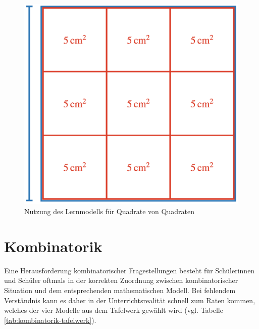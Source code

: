 \documentclass[
]{scrbook}
\theoremstyle{definition}
\theoremstyle{definition}
\theoremstyle{definition}
\theoremstyle{definition}
\theoremstyle{remark}
\begin{document}
\begin{enumerate}
  \begin{figure}

   {\centering \includegraphics[width=0.5\linewidth]{pictures/10-QuadratQuadrat} 

   }

   \caption{Nutzung des Lernmodells für Quadrate von Quadraten}\label{fig:QuadratQuadrat}
   \end{figure}
\end{enumerate}

\hypertarget{kombinatorik}{%
\section{Kombinatorik}\label{kombinatorik}}

Eine Herausforderung kombinatorischer Fragestellungen besteht für Schülerinnen und Schüler oftmals in der korrekten Zuordnung zwischen kombinatorischer Situation und dem entsprechenden mathematischen Modell. Bei fehlendem Verständnis kann es daher in der Unterrichtsrealität schnell zum Raten kommen, welches der vier Modelle aus dem Tafelwerk gewählt wird (vgl. Tabelle \ref{tab:kombinatorik-tafelwerk}).
\end{document}
